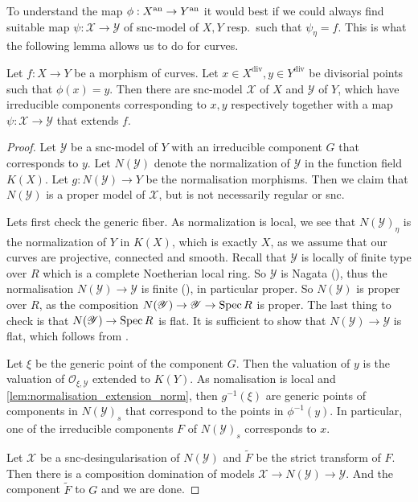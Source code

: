 To understand the map $\phi: X\an \to Y\an$ it would best if we could always find suitable map $\psi: \mathscr X \to \mathscr Y$ of snc-model of $X, Y$ resp.\ such that $\psi_\eta = f$. This is what the following lemma allows us to do for curves. 
\begin{lemma}\label{lem:snc_models_morphism_curves}
	Let $f: X \to Y$ be a morphism of curves. 
	Let $x \in X^{\text{div}}, y \in Y^{\text{div}}$ be divisorial points such that $\phi(x) = y$. 
	Then there are snc-model $\mathscr X$ of $X$ and $\mathscr Y$ of $Y$, which have irreducible components corresponding to $x, y$ respectively together with a map $\psi: \mathscr X \to \mathscr Y$ that extends $f$. 
\end{lemma} 
\begin{proof}
	Let $\mathscr Y$ be a snc-model of $Y$ with an irreducible component $G$ that corresponds to $y$. 
	Let $N(\mathscr Y)$ denote the normalization of $\mathscr Y$ in the function field $K(X)$. 
	Let $g: N(\mathscr Y) \to Y$ be the normalisation morphisms. 
	Then we claim that $N(\mathscr Y)$ is a proper model of $\mathscr X$, but is not necessarily regular or snc. 
	
	Lets first check the generic fiber.
	As normalization is local, we see that  $N(\mathscr Y)_\eta$ is the normalization of $Y$ in $K(X)$, which is exactly $X$, as we assume that our curves are projective, connected and smooth. 
	Recall that $\mathscr Y$ is locally of finite type over $R$ which is a complete Noetherian local ring. 
	So $\mathscr Y$ is Nagata (), thus the normalisation $N(\mathscr Y) \to \mathscr Y$  is finite (), in particular proper. 
	So $N(\mathscr Y)$ is proper over $R$, as the composition $N(\mathscr Y) \to \mathscr Y \to \operatorname{Spec} R$ is proper. 
	The last thing to check is that $N(\mathscr Y) \to \operatorname{Spec} R$ is flat. It is sufficient to show that $N(\mathscr Y) \to \mathscr Y$ is flat, which follows from \cite[thm.\ 18.H]{matsumuraCommutativeAlgebra1980}. 
	
	Let $\xi$ be the generic point of the component $G$. 
	Then the valuation of $y$ is the valuation of $\mathcal{O}_{\xi, \mathscr Y}$ extended to $K\left( Y \right) $. 
	As nomalisation is local and \cref{lem:normalisation_extension_norm}, then $g^{-1}(\xi)$ are generic points of components in $N(\mathscr Y)_s$ that correspond to the points in $\phi^{-1}(y)$. 
	In particular, one of the irreducible components $F$ of $N(\mathscr Y)_s$ corresponds to $x$. 

	Let $\mathscr X$ be a snc-desingularisation of $N(\mathscr Y)$ and $\tilde F$ be the strict transform of $F$. 
	Then there is a composition domination of models  $\mathscr X \to  N(\mathscr Y) \to \mathscr Y$.
	And the component $\tilde F$ to $G$ and we are done. 
\end{proof}

